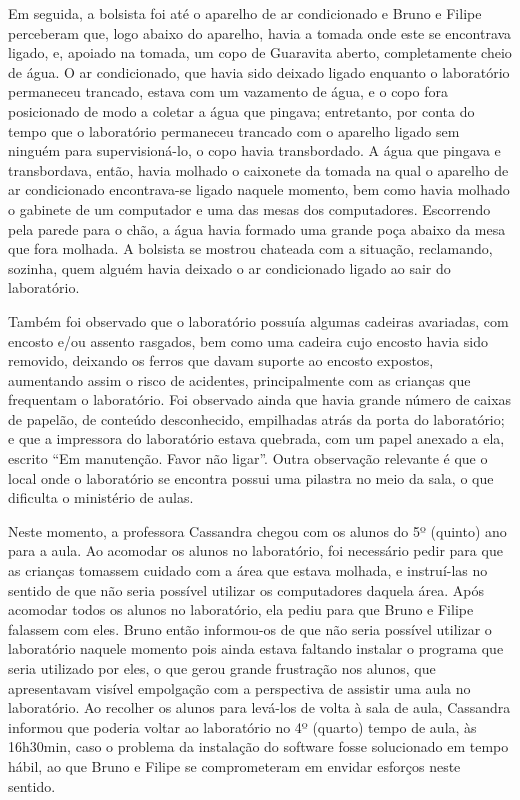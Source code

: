 Em seguida, a bolsista foi até o aparelho de ar condicionado e Bruno e Filipe perceberam que, logo abaixo do aparelho, havia a tomada onde este se encontrava ligado, e, apoiado na tomada, um copo de Guaravita aberto, completamente cheio de água. O ar condicionado, que havia sido deixado ligado enquanto o laboratório permaneceu trancado, estava com um vazamento de água, e o copo fora posicionado de modo a coletar a água que pingava; entretanto, por conta do tempo que o laboratório permaneceu trancado com o aparelho ligado sem ninguém para supervisioná-lo, o copo havia transbordado. A água que pingava e transbordava, então, havia molhado o caixonete da tomada na qual o aparelho de ar condicionado encontrava-se ligado naquele momento, bem como havia molhado o gabinete de um computador e uma das mesas dos computadores. Escorrendo pela parede para o chão, a água havia formado uma grande poça abaixo da mesa que fora molhada. A bolsista se mostrou chateada com a situação, reclamando, sozinha, quem alguém havia deixado o ar condicionado ligado ao sair do laboratório.

Também foi observado que o laboratório possuía algumas cadeiras avariadas, com encosto e/ou assento rasgados, bem como uma cadeira cujo encosto havia sido removido, deixando os ferros que davam suporte ao encosto expostos, aumentando assim o risco de acidentes, principalmente com as crianças que frequentam o laboratório. Foi observado ainda que havia grande número de caixas de papelão, de conteúdo desconhecido, empilhadas atrás da porta do laboratório; e que a impressora do laboratório estava quebrada, com um papel anexado a ela, escrito “Em manutenção. Favor não ligar”. Outra observação relevante é que o local onde o laboratório se encontra possui uma pilastra no meio da sala, o que dificulta o ministério de aulas.

Neste momento, a professora Cassandra chegou com os alunos do 5º (quinto) ano para a aula. Ao acomodar os alunos no laboratório, foi necessário pedir para que as crianças tomassem cuidado com a área que estava molhada, e instruí-las no sentido de que não seria possível utilizar os computadores daquela área. Após acomodar todos os alunos no laboratório, ela pediu para que Bruno e Filipe falassem com eles. Bruno então informou-os de que não seria possível utilizar o laboratório naquele momento pois ainda estava faltando instalar o programa que seria utilizado por eles, o que gerou grande frustração nos alunos, que apresentavam visível empolgação com a perspectiva de assistir uma aula no laboratório. Ao recolher os alunos para levá-los de volta à sala de aula, Cassandra informou que poderia voltar ao laboratório no 4º (quarto) tempo de aula, às 16h30min, caso o problema da instalação do software fosse solucionado em tempo hábil, ao que Bruno e Filipe se comprometeram em envidar esforços neste sentido.

